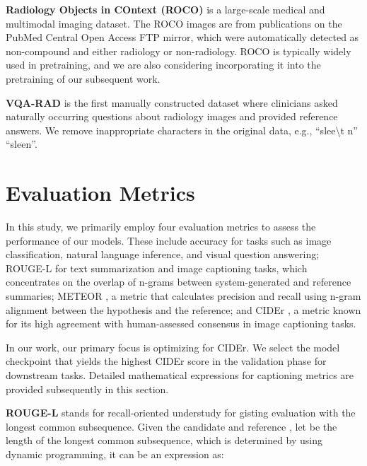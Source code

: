\documentclass[10pt]{article} \usepackage[preprint]{tmlr}
\begin{document}
\vspace{5pt}

\noindent \textbf{Radiology Objects in COntext (ROCO)} \citep{pelka2018radiology} is a large-scale medical and multimodal imaging dataset. The ROCO images are from publications on the PubMed Central Open Access FTP mirror, which were automatically detected as non-compound and either radiology or non-radiology. ROCO is typically widely used in pretraining, and we are also considering incorporating it into the pretraining of our subsequent work.
\vspace{5pt}

\noindent \textbf{VQA-RAD} \citep{lau2018dataset} is the first manually constructed dataset where clinicians asked naturally occurring questions about radiology images and provided reference answers. We remove inappropriate characters in the original data, e.g., ``slee\textbackslash t n''  ``sleen''.
\vspace{5pt}

\section{Evaluation Metrics} \label{sec:eval_metic}
In this study, we primarily employ four evaluation metrics to assess the performance of our models. These include accuracy for tasks such as image classification, natural language inference, and visual question answering; ROUGE-L \citep{lin2004rouge} for text summarization and image captioning tasks, which concentrates on the overlap of n-grams between system-generated and reference summaries; METEOR \citep{banerjee2005meteor}, a metric that calculates precision and recall using n-gram alignment between the hypothesis and the reference; and CIDEr \citep{vedantam2015cider}, a metric known for its high agreement with human-assessed consensus in image captioning tasks.

In our work, our primary focus is optimizing for CIDEr. We select the model checkpoint that yields the highest CIDEr score in the validation phase for downstream tasks. Detailed mathematical expressions for captioning metrics are provided subsequently in this section.

\vspace{5pt}
\noindent \textbf{ROUGE-L} stands for recall-oriented understudy for gisting evaluation with the longest common subsequence. Given the candidate  and reference , let  be the length of the longest common subsequence, which is determined by using dynamic programming, it can be an expression as:
\end{document}

